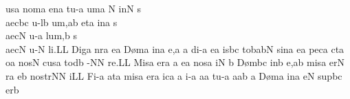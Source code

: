 \sgn {}us\punctum a\egn
\spatium
\sgn nom\punctum a\egn
\sgn {}en\punctum a\egn
\spatium
\sgn tu-\punctum a\egn
\sgn {}um\punctum a\egn
\spatium
\custos N
\lineaproxima
\sgn {}in\punctum N\egn
\spatium
\sgn s{\\ae}c\pes bc\egn
\sgn {}u{-l}\punctum b\egn
\sgn {}u{m,}\punctum a\augmentum b\egn
\spatium
\divisiominor
\spatium
\sgn {}et\punctum a\egn
\spatium
\sgn {}in\punctum a\egn
\spatium\sgn s{\\ae}c\punctum N\egn
\sgn {}u-\punctum a\egn
\sgn lu{m,}\punctum b\egn
\spatium
\sgn s{\\ae}c\punctum N\egn
\sgn {}u-\punctum N\egn
\sgn li.\punctum L\augmentum L\egn
\spatium
\divisiofinalis
\spatium
\sgn Dig\punctum a\egn
\sgn n{\a}r\punctum a\egn
\sgn {}e{}\punctum a\egn
\spatium
\sgn D{\o}m\punctum a\egn
\sgn {}in\punctum a\egn
\sgn {}e,\punctum a\egn
\spatium
\custos a
\lineaproxima
\sgn di-\punctum a\egn
\sgn {}e{}\punctum a\egn
\spatium
\sgn {}is\pes bc\egn
\sgn to{}\clivis ba\augmentumduplex bN\egn
\spatium
\divisiominor
\spatium
\sgn sin\punctum a\egn
\sgn {}e{}\punctum a\egn
\spatium\sgn pec\punctum a\egn
\sgn c{\a}t\punctum a\egn
\sgn {}o{}\punctum a\egn
\spatium
\sgn nos\punctum N\egn
\spatium\sgn cus\punctum a\egn
\sgn tod\punctum b\egn
\sgn {}{\\i}-\punctum N\augmentum N\egn
\sgn re.\punctum L\augmentum L\egn
\spatium\divisiofinalis\spatium
\sgn Mis\punctum a\egn
\sgn {}e{r}\punctum a\egn
{}\punctum a\egn
\sgn {}e{}\punctum a\egn
\spatium
\sgn nos\punctum a\egn
{}i{}\punctum N\egn
\spatium
\custos b
\lineaproxima
\sgn D{\o}m\pes bc\egn
\sgn {}in\punctum b\egn
\sgn {}e,\punctum a\augmentum b\egn
\spatium
\divisiominor
\spatium
\sgn mis\punctum a\egn
\sgn {}e{r}\punctum N\egn
\sgn {}{\e}r\engl{}\punctum a\egn
\sgn {}e{}\punctum b\egn
\spatium
\sgn no{str}\punctum N\augmentum N\egn
\sgn {}i{}\punctum L\augmentum L\egn
\spatium\divisiofinalis\spatium
\sgn Fi-\punctum a\egn
\sgn {}at\punctum a\egn
\spatium
\sgn mis\punctum a\egn
\sgn {}er\punctum a\egn
\sgn {}ic\punctum a\egn
{}\punctum a\egn
\sgn {}i-\punctum a\egn
\sgn {}a{}\punctum a\egn
\spatium
\sgn tu-\punctum a\egn
\sgn {}a{}\engl{}\punctum a\augmentum b\egn
\spatium
\custos a
\lineaproxima
\sgn D{\o}m\punctum a\egn
\sgn {}in\punctum a\egn
\sgn {}e{}\punctum N\egn
\spatium
\sgn sup\pes bc\egn
\sgn {}er\punctum b\egn
